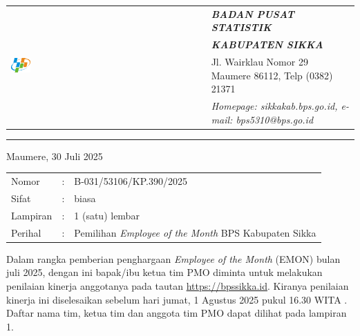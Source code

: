 \documentclass{article}
\begin{document}




\begin{tabular}{ll}
   \multirow{4}{*}{\includegraphics[width=0.10\textwidth]{logo/bps-logo.png}} %
   &
   \large{\textbf{\textit{BADAN PUSAT STATISTIK}}} \\
   & \large{\textbf{\textit{KABUPATEN SIKKA}}} \\
   & Jl. Wairklau Nomor 29 Maumere 86112, Telp (0382) 21371 \\
   & \textit{Homepage: sikkakab.bps.go.id, e-mail: bps5310@bps.go.id} \\
\end{tabular}

\hfill

\vspace{-1em} %

\rule{\linewidth}{1pt} %


\hfill
Maumere, 30 Juli 2025

\begin{tabular}{@{} lcl}
	Nomor&:&B-031/53106/KP.390/2025 \\
	Sifat&:&biasa \\
	Lampiran&:&1 (satu) lembar\\
    Perihal&:& Pemilihan \textit{Employee of the Month} BPS Kabupaten Sikka\\
\end{tabular}

\bigskip %

Dalam rangka pemberian penghargaan \textit{Employee of the Month} (EMON) bulan juli 2025, dengan ini bapak/ibu ketua tim PMO diminta untuk melakukan penilaian kinerja anggotanya pada tautan \href{https://bpssikka.id/}{https://bpssikka.id}.
Kiranya penilaian kinerja ini diselesaikan sebelum hari jumat, 1 Agustus 2025 pukul 16.30 WITA \@.
Daftar nama tim, ketua tim dan anggota tim PMO dapat dilihat pada lampiran 1.
\end{document}
